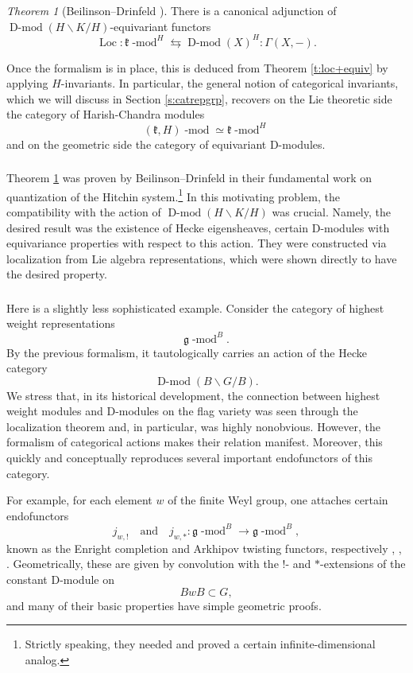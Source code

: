 \documentclass[10pt]{amsart}
\newcommand{\fg}{\mathfrak{g}}
\newcommand{\on}{\operatorname}
\renewcommand{\mod}{\on{-mod}}
\newcommand{\Dmod}{\on{D-mod}}
\theoremstyle{remark}
\newcommand{\fk}{\mathfrak{k}}
\newtheorem{theo}[subsubsection]{Theorem}
\numberwithin{equation}{section}
\renewcommand{\mod}{\operatorname{-mod}}
\begin{document}
\begin{theo}[Beilinson--Drinfeld \cite{bdh}]\label{t:lochchmod+eq}There is a canonical adjunction of $\Dmod(H 
\backslash K / 
H)$-equivariant functors 
	\[
	\on{Loc}: \fk\mod^H \leftrightarrows \Dmod(X)^H: \Gamma(X, -). 
	\]
\end{theo}

Once the formalism is in place, this is deduced from Theorem \ref{t:loc+equiv} 
by applying $H$-invariants. In particular, the general notion of categorical 
invariants, which we will discuss in Section \ref{s:catrepgrp}, recovers on the 
Lie theoretic side the category of Harish-Chandra modules
%
\[
   (\fk, H)\mod \simeq \fk\mod^H
\]
%
and on the geometric side the category of equivariant D-modules. 

\subsubsection{}\label{ss:hitchinhecke}
Theorem \ref{t:lochchmod+eq} was proven by Beilinson--Drinfeld in their fundamental work \cite{bdh} on quantization of the Hitchin system.\footnote{Strictly speaking, they needed 
and proved a certain infinite-dimensional analog.} In this motivating problem, 
the 
compatibility with the action of $\Dmod(H \backslash K / H)$ was crucial. 
Namely, the desired result was the existence of Hecke eigensheaves, certain D-modules with 
equivariance properties with respect to this action. 
They were constructed via localization from Lie algebra representations, 
which were shown directly to have the desired property. 



\subsubsection{}Here is a slightly less sophisticated example. Consider the 
category of highest weight representations 
%
\[
    \fg\mod^B.
\]
%
By the previous formalism, it tautologically carries an action of the Hecke 
category 
%
\[
   \Dmod(B \backslash G / B). 
\]
%
We stress that, in its historical development, the connection between highest weight modules and D-modules on the flag variety was seen through the localization theorem and, in particular, was highly nonobvious. However, the formalism of categorical actions makes their relation manifest. Moreover, this quickly and conceptually reproduces several important endofunctors of 
this category.

 For example, for each element $w$ of the finite Weyl group, one 
attaches certain endofunctors 
%
\[
  j_{w, !} \quad \text{and} \quad j_{w, *}: \fg\mod^B \rightarrow \fg\mod^B,
\]
%
known as the Enright completion and Arkhipov twisting functors, respectively \cite{enright79}, \cite{bb82}, \cite{ark}. 
Geometrically, these are given by convolution with the $!$- and $*$-extensions 
of the constant D-module on 
%
\[
     BwB \subset G, 
\]
%
and many of their basic properties have simple geometric proofs.
\end{document}
